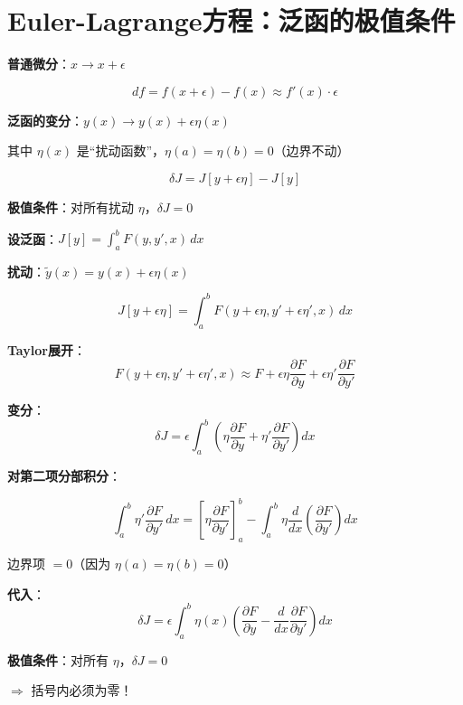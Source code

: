 \documentclass[12pt, a4paper]{ctexart}
\begin{document}
\section{Euler-Lagrange方程：泛函的极值条件}

\begin{blackboard}[变分的概念]

\textbf{普通微分}：$x \to x + \epsilon$

\[
df = f(x + \epsilon) - f(x) \approx f'(x) \cdot \epsilon
\]

\textbf{泛函的变分}：$y(x) \to y(x) + \epsilon \eta(x)$

其中 $\eta(x)$ 是``扰动函数''，$\eta(a) = \eta(b) = 0$（边界不动）

\[
\delta J = J[y + \epsilon\eta] - J[y]
\]

\textbf{极值条件}：对所有扰动 $\eta$，$\delta J = 0$

\end{blackboard}

\begin{blackboard}

\textbf{设泛函}：$J[y] = \int_a^b F(y, y', x) \, dx$

\textbf{扰动}：$\tilde{y}(x) = y(x) + \epsilon \eta(x)$

\[
J[y + \epsilon\eta] = \int_a^b F(y + \epsilon\eta, y' + \epsilon\eta', x) \, dx
\]

\textbf{Taylor展开}：
\[
F(y + \epsilon\eta, y' + \epsilon\eta', x) \approx F + \epsilon\eta \frac{\partial F}{\partial y} + \epsilon\eta' \frac{\partial F}{\partial y'}
\]

\textbf{变分}：
\[
\delta J = \epsilon \int_a^b \left( \eta \frac{\partial F}{\partial y} + \eta' \frac{\partial F}{\partial y'} \right) dx
\]

\end{blackboard}

\begin{blackboard}[推导（续）：分部积分]

\textbf{对第二项分部积分}：

\[
\int_a^b \eta' \frac{\partial F}{\partial y'} \, dx = \left[ \eta \frac{\partial F}{\partial y'} \right]_a^b - \int_a^b \eta \frac{d}{dx}\left( \frac{\partial F}{\partial y'} \right) dx
\]

边界项 $= 0$（因为 $\eta(a) = \eta(b) = 0$）

\textbf{代入}：
\[
\delta J = \epsilon \int_a^b \eta(x) \left( \frac{\partial F}{\partial y} - \frac{d}{dx}\frac{\partial F}{\partial y'} \right) dx
\]

\textbf{极值条件}：对所有 $\eta$，$\delta J = 0$

$\Rightarrow$ 括号内必须为零！

\end{blackboard}
\end{document}
